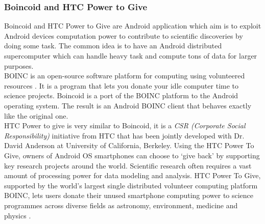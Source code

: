 \subsubsection{Boincoid and HTC Power to Give}
Boincoid and HTC Power to Give are Android application which aim is  to exploit Android devices computation power to contribute to scientific discoveries by doing some task. The common idea is to have an Android distributed supercomputer which can handle heavy task and compute tons of data for larger purposes.\\
BOINC is an open-source software platform for computing using volunteered resources \cite{boinc2017open}. It is a program that lets you donate your idle computer time to science projects. Boincoid is a port of the BOINC platform to the Android operating system. The result is an Android BOINC client that behaves exactly like the original one.\\
HTC Power to give is very similar to Boincoid, it is a \textit{CSR (Corporate Social Responsibility)} initiative from HTC that has been jointly developed with Dr. David Anderson at University of California, Berkeley. Using the HTC Power To Give, owners of Android OS smartphones can choose to ‘give back’ by supporting key research projects around the world. Scientific research often requires a vast amount of processing power for data modeling and analysis. HTC Power To Give, supported by the world’s largest single distributed volunteer computing platform BOINC, lets users donate their unused smartphone computing power to science programmes across diverse fields as astronomy, environment, medicine and physics \cite{htc2017power}.

